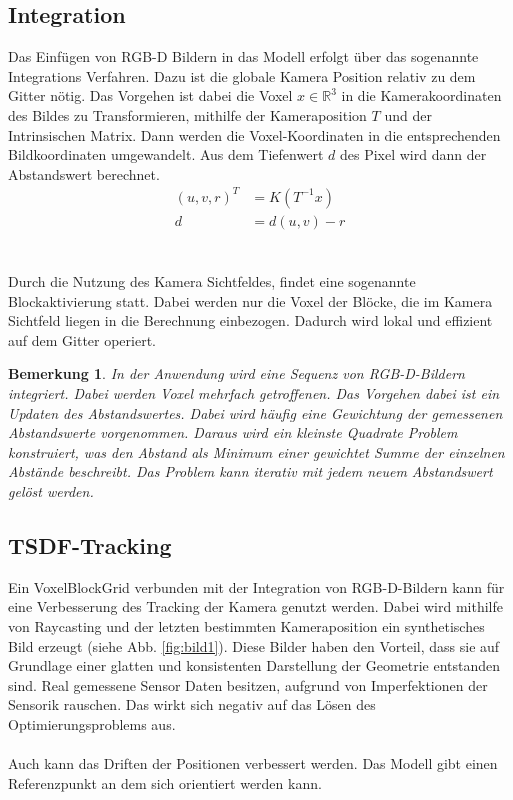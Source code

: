 \documentclass[12pt,DIV=15,BCOR=15mm,twoside,headsepline,abstract=true,listof=totoc,bibliography=totoc]{scrreprt}
\newtheorem{remark}{Bemerkung}[chapter]
\theoremstyle{remark}    %
\begin{document}
    \subsection{Integration}
    \label{sec:integration}
    Das Einfügen von \ac{RGB-D} Bildern in das Modell erfolgt über das sogenannte Integrations Verfahren. Dazu ist die globale Kamera Position relativ zu dem 
    Gitter nötig. Das Vorgehen ist dabei die Voxel $x\in \mathbb{R}^3$ in die Kamerakoordinaten des Bildes zu Transformieren, mithilfe der Kameraposition $T$ 
    und der Intrinsischen Matrix. Dann werden die Voxel-Koordinaten in die entsprechenden Bildkoordinaten umgewandelt. Aus dem Tiefenwert $d$ des Pixel wird 
    dann der Abstandswert berechnet. \cite{dong2023ashmodernframeworkparallel}
    \begin{align}
        \left( u,v,r \right)^T & = K(T^{-1}x) \\
       d  &= d(u, v) -r
    \end{align} \\\\
    Durch die Nutzung des Kamera Sichtfeldes, findet eine sogenannte Blockaktivierung statt. Dabei werden nur die Voxel der Blöcke, die im Kamera Sichtfeld liegen
    in die Berechnung einbezogen. Dadurch wird lokal und effizient auf dem Gitter operiert.
    \begin{remark} \label{bem:weight_integration}
    In der Anwendung wird eine Sequenz von \ac{RGB-D}-Bildern integriert. Dabei werden Voxel mehrfach getroffenen. Das Vorgehen dabei ist
    ein Updaten des Abstandswertes. Dabei wird häufig eine Gewichtung der gemessenen Abstandswerte vorgenommen. Daraus wird ein kleinste Quadrate Problem konstruiert, was 
    den Abstand als Minimum einer gewichtet Summe der einzelnen Abstände beschreibt. Das Problem kann iterativ mit jedem neuem Abstandswert gelöst werden. 
    \cite{dong2023ashmodernframeworkparallel}
    \end{remark}

    \subsection{TSDF-Tracking}
    Ein VoxelBlockGrid verbunden mit der Integration von \ac{RGB-D}-Bildern kann für eine Verbesserung des Tracking der Kamera genutzt werden. Dabei wird mithilfe 
    von Raycasting und der letzten bestimmten Kameraposition ein synthetisches Bild erzeugt (siehe Abb. \ref{fig:bild1}). Diese Bilder haben den Vorteil, dass sie auf Grundlage einer glatten
    und konsistenten Darstellung der Geometrie entstanden sind. Real gemessene Sensor Daten besitzen, aufgrund von Imperfektionen der Sensorik rauschen. Das wirkt
    sich negativ auf das Lösen des Optimierungsproblems aus. \\\\
    Auch kann das Driften der Positionen verbessert werden. Das Modell gibt einen Referenzpunkt an dem sich orientiert werden kann.\cite{Zhou2018}
\end{document}
